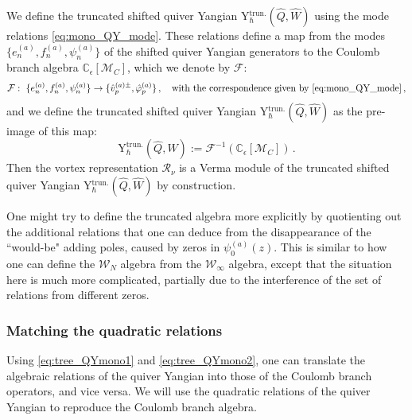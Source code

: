 \documentclass[12pt,a4paper]{article}
\newcounter{subsubsubsection}[subsubsection]
\renewcommand{\(}{\left(}
\renewcommand{\)}{\right)}
\newcommand{\eps}{\epsilon}
\renewcommand{\(}{\left(}
\renewcommand{\)}{\right)}
\begin{document}
We define the truncated shifted quiver Yangian Y$^{\text{trun.}}_{\hbar}(\widehat{Q},\widehat{W})$ using the  mode relations \eqref{eq:mono_QY_mode}. 
These relations define a map from the modes $\{e^{(a)}_n,f^{(a)}_n,\psi^{(a)}_n\}$ of the shifted quiver Yangian generators to the Coulomb branch algebra $\mathbb{C}_\eps[\mathcal{M}_C]$, which we denote by $\mathcal{F}$:
\begin{equation}\label{eq:map_QY_to_mono}
\mathcal{F}:\ \{e^{(a)}_n,f^{(a)}_n,\psi^{(a)}_n\}\to \{\hat{v}^{(a)\pm}_p,\hat{\varphi}^{(a)}_p\}\,, \quad \text{with the correspondence given by \eqref{eq:mono_QY_mode}}\,,
\end{equation}
and we define the truncated shifted quiver Yangian Y$^{\text{trun.}}_{\hbar}(\widehat{Q},\widehat{W})$ as the pre-image of this map:
\begin{equation}
\mathrm{Y}^{\text{trun.}}_{\hbar}(\widehat{Q},\widehat{W}):=\mathcal{F}^{-1}(\mathbb{C}_\eps[\mathcal{M}_C])\,.
\end{equation}
Then the vortex representation $\mathcal{R}_\nu$ is a Verma module of the truncated shifted quiver Yangian Y$^{\text{trun.}}_{\hbar}(\widehat{Q},\widehat{W})$ by construction. 

One might try to define the truncated algebra more explicitly by quotienting out the additional relations that one can deduce from the disappearance of the ``would-be" adding poles, caused by zeros in $\psi^{(a)}_0(z)$.
This is similar to how one can define the $\mathcal{W}_{N}$ algebra from the $\mathcal{W}_{\infty}$ algebra, except that the situation here is much more complicated, partially due to the interference of the set of relations from different zeros. 

\subsubsection{Matching the quadratic relations}
Using \eqref{eq:tree_QYmono1} and \eqref{eq:tree_QYmono2}, one can translate the algebraic relations of the quiver Yangian into those of the Coulomb branch operators, and vice versa. 
We will use the quadratic relations of the quiver Yangian to reproduce the Coulomb branch algebra.

\end{document}
